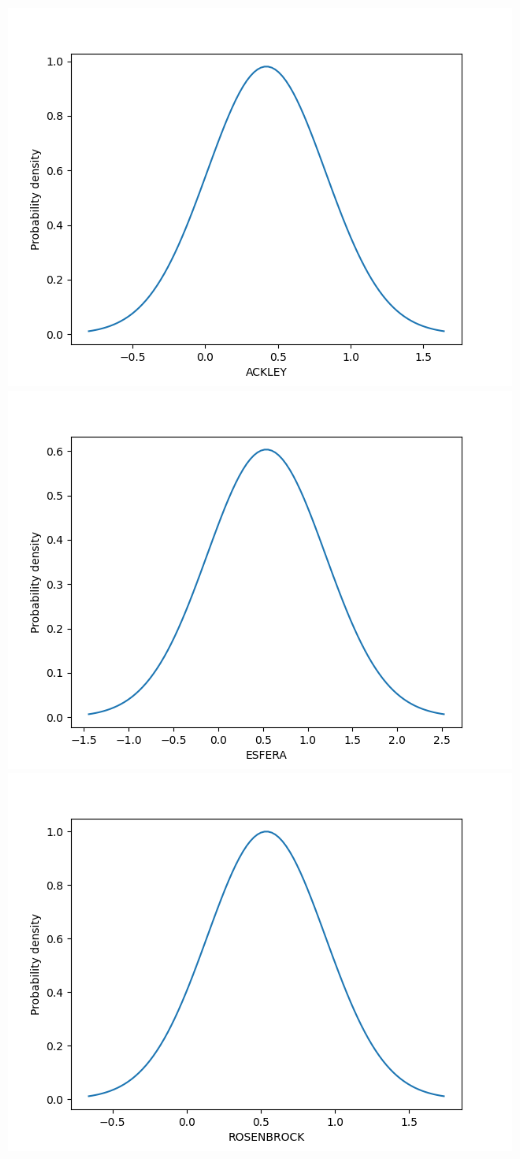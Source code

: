 \documentclass{article}
\begin{document}
\includegraphics[scale=0.5]{DE/ackley.png}
\includegraphics[scale=0.5]{DE/esfera.png}
\includegraphics[scale=0.5]{DE/rosenbrock.png}
\end{document}

